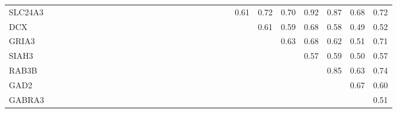 \begin{longtable}{lrrrrrrrrrrrrrrrrrrrrrrrrrrrrr}
SLC24A3 &             &              &             &              &               &            &              &             &           &             &              &              &              &              &             &               &              &              &            &             &            &               &      0.61 &        0.72 &        0.70 &        0.92 &       0.87 &         0.68 &       0.72 \\
DCX     &             &              &             &              &               &            &              &             &           &             &              &              &              &              &             &               &              &              &            &             &            &               &           &        0.61 &        0.59 &        0.68 &       0.58 &         0.49 &       0.52 \\
GRIA3   &             &              &             &              &               &            &              &             &           &             &              &              &              &              &             &               &              &              &            &             &            &               &           &             &        0.63 &        0.68 &       0.62 &         0.51 &       0.71 \\
SIAH3   &             &              &             &              &               &            &              &             &           &             &              &              &              &              &             &               &              &              &            &             &            &               &           &             &             &        0.57 &       0.59 &         0.50 &       0.57 \\
RAB3B   &             &              &             &              &               &            &              &             &           &             &              &              &              &              &             &               &              &              &            &             &            &               &           &             &             &             &       0.85 &         0.63 &       0.74 \\
GAD2    &             &              &             &              &               &            &              &             &           &             &              &              &              &              &             &               &              &              &            &             &            &               &           &             &             &             &            &         0.67 &       0.60 \\
GABRA3  &             &              &             &              &               &            &              &             &           &             &              &              &              &              &             &               &              &              &            &             &            &               &           &             &             &             &            &              &       0.51 \\
\end{longtable}


